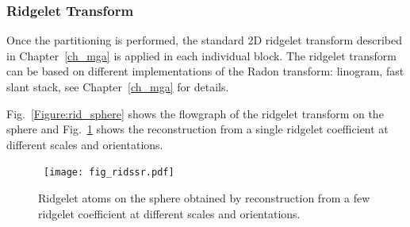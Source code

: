 \newpage
\subsubsection{Ridgelet Transform}

Once the partitioning is performed, the standard 2D ridgelet transform described in Chapter~\ref{ch_mga} is applied  in each individual block. The ridgelet transform can be based on different implementations of the Radon transform: linogram, fast slant stack, see Chapter~\ref{ch_mga} for details. 

Fig.~\ref{Figure:rid_sphere} shows the flowgraph of the ridgelet transform 
on the sphere and Fig.~\ref{Figure:back_rid} shows the reconstruction from a single ridgelet 
coefficient at different scales and orientations.


\begin{figure}[htb]
\centerline{
\hbox{
\texttt{[image: fig\_ridssr.pdf]}
}}
\caption{Ridgelet atoms on the sphere obtained by reconstruction from a few ridgelet coefficient at different scales and orientations.}
\label{Figure:back_rid}
\end{figure}

